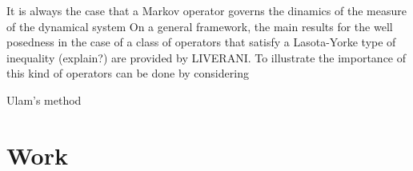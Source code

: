 It is always the case that a Markov operator governs the dinamics of the measure of the dynamical system On a general framework, the main results for the well posedness in the case of a class of operators that satisfy a Lasota-Yorke type of inequality (explain?) are provided by LIVERANI. To illustrate the importance of this kind of operators can be done by considering 

Ulam's method





\section*{Work}




